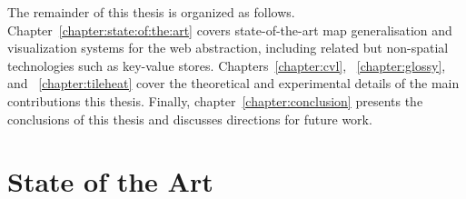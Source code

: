 \documentclass[11pt, oneside]{report}
\begin{document}
{The remainder of this thesis is organized as follows. Chapter~\ref{chapter:state:of:the:art} covers state-of-the-art map generalisation and visualization systems for the web abstraction, including related but non-spatial technologies such as key-value stores. Chapters~\ref{chapter:cvl}, ~\ref{chapter:glossy}, and ~\ref{chapter:tileheat} cover the theoretical and experimental details of the main contributions this thesis. Finally, chapter~\ref{chapter:conclusion} presents the conclusions of this thesis and discusses directions for future work.






\part{State of the Art}


}
\end{document}
